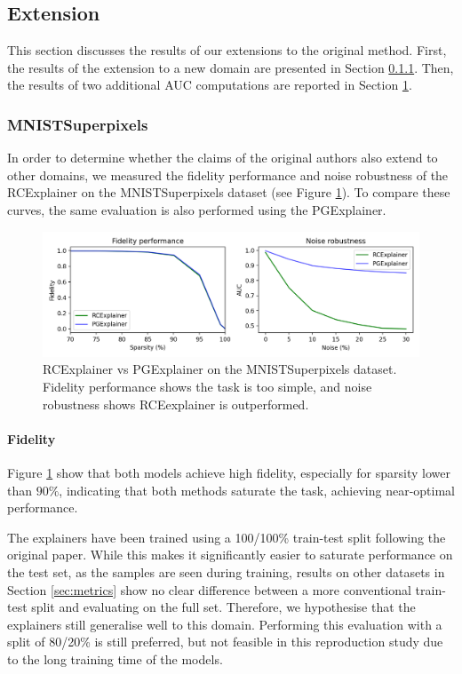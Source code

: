 \subsection{Extension}
\label{sec:extension}
This section discusses the results of our extensions to the original method. First, the results of the extension to a new domain are presented in Section \ref{subsec:mnist_superpixel}. Then, the results of two additional AUC computations are reported in Section \ref{fig:extension:mnist_perfomance}. 

\subsubsection{MNISTSuperpixels} \label{subsec:mnist_superpixel}
In order to determine whether the claims of the original authors also extend to other domains, we measured the fidelity performance and noise robustness of the RCExplainer on the MNISTSuperpixels dataset (see Figure \ref{fig:extension:mnist_perfomance}). To compare these curves, the same evaluation is also performed using the PGExplainer.

\begin{figure}
    \centerline{\includegraphics[width=1\textwidth]{Images/MNIST_fidelity_noise.png}}
    \caption{RCExplainer vs PGExplainer on the MNISTSuperpixels dataset. Fidelity performance shows the task is too simple, and noise robustness shows RCEexplainer is outperformed.}
    \label{fig:extension:mnist_perfomance}
\end{figure}

\paragraph{Fidelity}
Figure \ref{fig:extension:mnist_perfomance} show that both models achieve high fidelity, especially for sparsity lower than $90\%$, indicating that both methods saturate the task, achieving near-optimal performance. 

The explainers have been trained using a 100/100\% train-test split following the original paper. While this makes it significantly easier to saturate performance on the test set, as the samples are seen during training, results on other datasets in Section \ref{sec:metrics} show no clear difference between a more conventional train-test split and evaluating on the full set. Therefore, we hypothesise that the explainers still generalise well to this domain. Performing this evaluation with a split of 80/20\% is still preferred, but not feasible in this reproduction study due to the long training time of the models.

